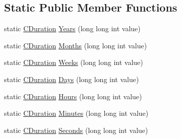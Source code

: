 \subsection*{Static Public Member Functions}
\begin{DoxyCompactItemize}
\item 
static \mbox{\hyperlink{class_c_duration}{C\+Duration}} \mbox{\hyperlink{class_c_duration_a2a0a70dd3c8c7f30719e5be1609fea15}{Years}} (long long int value)
\item 
static \mbox{\hyperlink{class_c_duration}{C\+Duration}} \mbox{\hyperlink{class_c_duration_a15e994d6b3ba80f2e4dd37b8120e4807}{Months}} (long long int value)
\item 
static \mbox{\hyperlink{class_c_duration}{C\+Duration}} \mbox{\hyperlink{class_c_duration_a76d9ed83e86188a90a4637f6441f9e4b}{Weeks}} (long long int value)
\item 
static \mbox{\hyperlink{class_c_duration}{C\+Duration}} \mbox{\hyperlink{class_c_duration_a4d915b832c458ce651397df2dcc74311}{Days}} (long long int value)
\item 
static \mbox{\hyperlink{class_c_duration}{C\+Duration}} \mbox{\hyperlink{class_c_duration_ab4cd5a25444b7fe08b780958e2a6db0d}{Hours}} (long long int value)
\item 
static \mbox{\hyperlink{class_c_duration}{C\+Duration}} \mbox{\hyperlink{class_c_duration_a33ff2602f80347e80273fedcc4acb026}{Minutes}} (long long int value)
\item 
static \mbox{\hyperlink{class_c_duration}{C\+Duration}} \mbox{\hyperlink{class_c_duration_aad9135a51f945440c6dc2ec1c2b19bc7}{Seconds}} (long long int value)
\end{DoxyCompactItemize}
